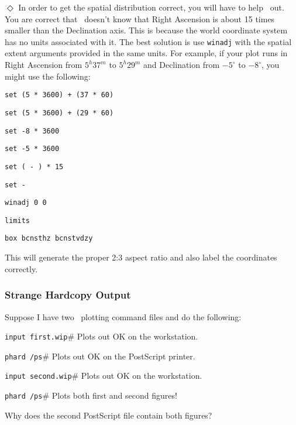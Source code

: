 \indent$\Diamond$
In order to get the spatial distribution correct, you will have to
help \wip\ out.
You are correct that \wip\ doesn't know that Right Ascension is about
15 times smaller than the Declination axis.
This is because the world coordinate
system
has no units associated with it.
The best solution is use {\tt winadj} with the spatial
extent arguments provided in the same units.
For example, if your plot
runs in Right Ascension from $5^h 37^m$ to $5^h 29^m$
and Declination from $-5^\circ$ to $-8^\circ$, you might use the following:
\begin{wiplist}%
  \item {\tt set  (5 * 3600) + (37 * 60)}
  \item {\tt set  (5 * 3600) + (29 * 60)}
  \item {\tt set  -8 * 3600}
  \item {\tt set  -5 * 3600}
  \item {\tt set  ( - ) * 15}
  \item {\tt set   - }
  \item {\tt winadj 0  0 }
  \item {\tt limits    }
  \item {\tt box bcnsthz bcnstvdzy}
\end{wiplist}
This will generate the proper 2:3 aspect ratio and also label the coordinates
correctly.

\subsubsection*         {Strange Hardcopy Output}

Suppose I have two \wip\ plotting command files and do the following:
\begin{wiplist}%
  \item {\tt input first.wip}\hfill\# Plots out OK on the workstation.
  \samepage
  \item {\tt phard /ps}\hfill\# Plots out OK on the PostScript printer.
  \item {\tt input second.wip}\hfill\# Plots out OK on the workstation.
  \item {\tt phard /ps}\hfill\# Plots both first and second figures!
\end{wiplist}
Why does the second PostScript file contain both figures?

